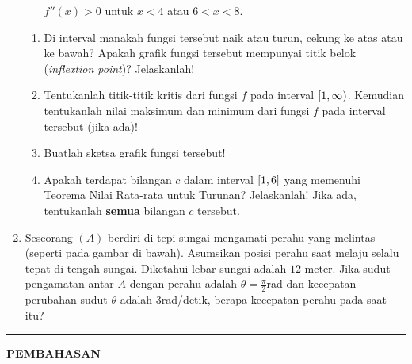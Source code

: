 \begin{enumerate}[leftmargin=*, label={\arabic*}.]
\begin{itemize}
    $f''(x)>0$ untuk $x<4$ atau $6 < x < 8$.
\end{itemize}
\begin{enumerate}[label={\alph*}.]
    \item Di interval manakah fungsi tersebut naik atau turun, cekung ke atas atau 
    ke bawah? Apakah grafik fungsi tersebut mempunyai titik belok 
    (\textit{inflextion point})? Jelaskanlah!
    \item Tentukanlah titik-titik kritis dari fungsi $f$ pada interval 
    $\cintervalo*{1,\infty}$. Kemudian tentukanlah nilai maksimum dan minimum dari fungsi $f$ 
    pada interval tersebut (jika ada)!
    \item Buatlah sketsa grafik fungsi tersebut!
    \item Apakah terdapat bilangan $c$ dalam interval $\cintervalc*{1,6}$ yang memenuhi 
    Teorema Nilai Rata-rata untuk Turunan? Jelaskanlah! Jika ada, tentukanlah \textbf{semua} 
    bilangan $c$ tersebut.
\end{enumerate}
\item Seseorang $(A)$ berdiri di tepi sungai mengamati perahu yang melintas (seperti pada 
gambar di bawah). Asumsikan posisi perahu saat melaju selalu tepat di tengah sungai. Diketahui 
lebar sungai adalah $12$ meter. Jika sudut pengamatan antar $A$ dengan perahu adalah 
$\theta =\frac{\pi}{2}$rad dan kecepatan perubahan sudut $\theta$ adalah $3$rad/detik, berapa 
kecepatan perahu pada saat itu?
\vspace{0.2cm}
\begin{center}
\end{center}
\end{enumerate}
\vspace{0.2cm}
\hrule height 1pt
\vspace{0.5cm}
\begin{center}
    \textbf{\large{PEMBAHASAN}}
\end{center}

